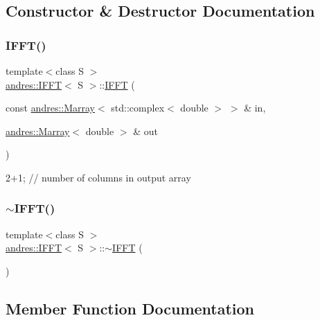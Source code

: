 \subsection{Constructor \& Destructor Documentation}
\mbox{\label{classandres_1_1IFFT_ab99387b8042cb2f7748ff735fa227d34}} 
\subsubsection{\texorpdfstring{I\+F\+F\+T()}{IFFT()}}
{\footnotesize\ttfamily template$<$class S $>$ \\
\hyperlink{classandres_1_1IFFT}{andres\+::\+I\+F\+FT}$<$ S $>$\+::\hyperlink{classandres_1_1IFFT}{I\+F\+FT} (\begin{DoxyParamCaption}\item[{const \hyperlink{classandres_1_1Marray}{andres\+::\+Marray}$<$ std\+::complex$<$ double $>$ $>$ \&}]{in,  }\item[{\hyperlink{classandres_1_1Marray}{andres\+::\+Marray}$<$ double $>$ \&}]{out }\end{DoxyParamCaption})}

2+1; // number of columns in output array \mbox{\label{classandres_1_1IFFT_a01d5f0a0d262ee285b0517559418cf97}} 
\subsubsection{\texorpdfstring{$\sim$\+I\+F\+F\+T()}{~IFFT()}}
{\footnotesize\ttfamily template$<$class S $>$ \\
\hyperlink{classandres_1_1IFFT}{andres\+::\+I\+F\+FT}$<$ S $>$\+::$\sim$\hyperlink{classandres_1_1IFFT}{I\+F\+FT} (\begin{DoxyParamCaption}{ }\end{DoxyParamCaption})\hspace{0.3cm}{\ttfamily [inline]}}



\subsection{Member Function Documentation}
\mbox{\label{classandres_1_1IFFT_aa73b7f9e34a4e62f6d2ff244a656dc71}} 

